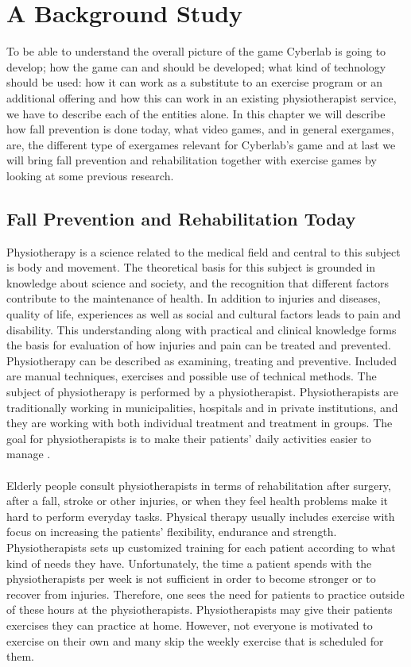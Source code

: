 \chapter{A Background Study}
To be able to understand the overall picture of the game Cyberlab is going to develop; how the game can and should be developed; what kind of technology should be used: how it can work as a substitute to an exercise program or an additional offering and how this can work in an existing physiotherapist service, we have to describe each of the entities alone. In this chapter we will describe how fall prevention is done today, what video games, and in general exergames, are, the different type of exergames relevant for Cyberlab's game and at last we will bring fall prevention and rehabilitation together with exercise games by looking at some previous research. 

\section{Fall Prevention and Rehabilitation Today}
Physiotherapy is a science related to the medical field and central to this subject is body and movement. The theoretical basis for this subject is grounded in knowledge about science and society, and the recognition that different factors contribute to the maintenance of health. In addition to injuries and diseases, quality of life, experiences as well as social and cultural factors leads to pain and disability. This understanding along with practical and clinical knowledge forms the basis for evaluation of how injuries and pain can be treated and prevented. Physiotherapy can be described as examining, treating and preventive. Included are manual techniques, exercises and possible use of technical methods. The subject of physiotherapy is performed by a physiotherapist. Physiotherapists are traditionally working in municipalities, hospitals and in private institutions, and they are working with both individual treatment and treatment in groups. The goal for physiotherapists is to make their patients’ daily activities easier to manage \cite{physiotherapy1}\cite{physiotherapy2}.\\ \\
Elderly people consult physiotherapists in terms of rehabilitation after surgery, after a fall, stroke or other injuries, or when they feel health problems make it hard to perform everyday tasks. Physical therapy usually includes exercise with focus on increasing the patients’ flexibility, endurance and strength. Physiotherapists sets up customized training for each patient according to what kind of needs they have. Unfortunately, the time a patient spends with the physiotherapists per week is not sufficient in order to become stronger or to recover from injuries. Therefore, one sees the need for patients to practice outside of these hours at the physiotherapists. Physiotherapists may give their patients exercises they can practice at home. However, not everyone is motivated to exercise on their own and many skip the weekly exercise that is scheduled for them. \cite{physiotherapy2} 

